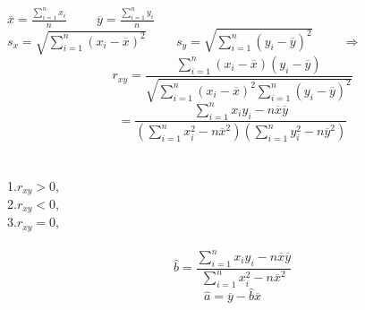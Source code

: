 
\immediate{}
\immediate{}
%
\begin{minipage}[b][14cm][t]{\textwidth}
\begin{center}\large{}\end{center}
\begin{large}
\\
$\overline{x}=\frac{\sum_{i=1}^{n}x_i}{n} \hspace{1cm} \overline{y}=\frac{\sum_{i=1}^{n}y_i}{n}$\\
$s_x=\sqrt{\sum_{i=1}^{n}(x_i-\overline{x})^2} \hspace{1cm} s_y=\sqrt{\sum_{i=1}^{n}(y_i-\overline{y})^2} \hspace{1cm}\Longrightarrow$\\
\[
  r_{xy} = \frac{\sum_{i=1}^{n}(x_i-\overline{x})(y_i-\overline{y})}{\sqrt{\sum_{i=1}^{n}(x_i-\overline{x})^2 \sum_{i=1}^{n}(y_i-\overline{y})^2}}
\]
\[
  = \frac{\sum_{i=1}^{n}x_i y_i - n\overline{x}\overline{y}}{(\sum_{i=1}^{n}x_i^2-n\overline{x}^2) (\sum_{i=1}^{n}y_i^2-n\overline{y}^2)}
\]\\
\\
1.$r_{xy} > 0$,\\
2.$r_{xy} < 0$,\\
3.$r_{xy} = 0$, \\[10pt]
\\
\[
  \hat{b}=\frac{\sum_{i=1}^{n}x_i y_i - n\overline{x}\overline{y}}{\sum_{i=1}^{n}x_i^2 - n\overline{x}^2}
\]
\[
  \hat{a}=\overline{y}-\hat{b}\overline{x}
\]
\end{large}
\end{minipage}
